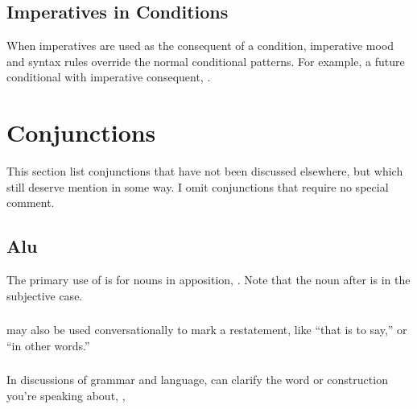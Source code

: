 \subsection{Imperatives in Conditions} When imperatives are used as
the consequent of a condition, imperative mood and syntax rules
override the normal conditional patterns.  For example, a future
conditional with imperative consequent,  .  


\section{Conjunctions}
\noindent This section list conjunctions that have not been discussed
elsewhere, but which still deserve mention in some way.  I omit
conjunctions that require no special comment.

\subsection{Alu} The primary use of  is for nouns in
apposition,  .  Note
that the noun after  is in the subjective case.
\label{syn:conj:alu}

\subsubsection{}  may also be used conversationally to mark a
restatement, like ``that is to say,'' or ``in other words.''
 

\subsubsection{} In discussions of grammar and language,  can
clarify the word or construction you're speaking about,
,
 

